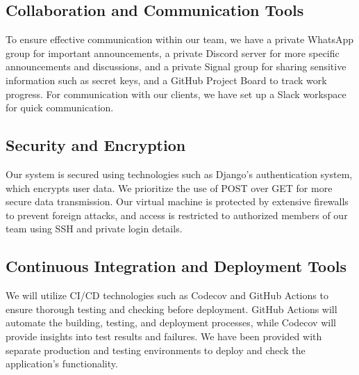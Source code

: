 \documentclass[12pt]{article}
\begin{document}
\subsection{Collaboration and Communication Tools}
To ensure effective communication within our team, we have a private WhatsApp group for important announcements, a private Discord server for more specific announcements and discussions, and a private Signal group for sharing sensitive information such as secret keys, and a GitHub Project Board to track work progress. For communication with our clients, we have set up a Slack workspace for quick communication.

\subsection{Security and Encryption}
Our system is secured using technologies such as Django's authentication system, which encrypts user data. We prioritize the use of POST over GET for more secure data transmission. Our virtual machine is protected by extensive firewalls to prevent foreign attacks, and access is restricted to authorized members of our team using SSH and private login details.

\subsection{Continuous Integration and Deployment Tools}
We will utilize CI/CD technologies such as Codecov and GitHub Actions to ensure thorough testing and checking before deployment. GitHub Actions will automate the building, testing, and deployment processes, while Codecov will provide insights into test results and failures. We have been provided with separate production and testing environments to deploy and check the application's functionality.

\newpage
\end{document}
